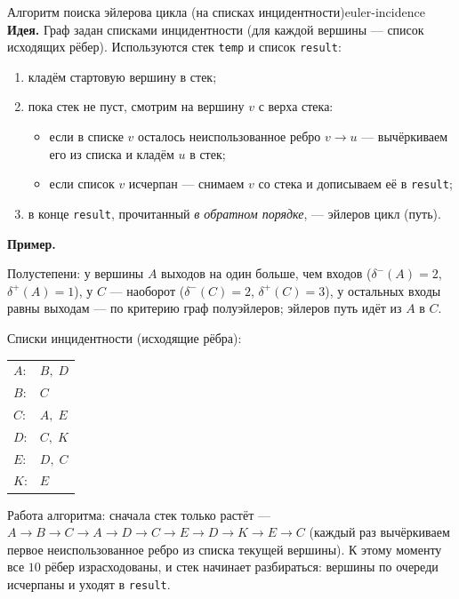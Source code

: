 \begin{algo}{Алгоритм поиска эйлерова цикла (на списках инцидентности)}{euler-incidence}
\textbf{Идея.} Граф задан списками инцидентности (для каждой вершины ---
список исходящих рёбер). Используются стек \texttt{temp} и список
\texttt{result}:

\begin{enumerate}
  \item кладём стартовую вершину в стек;
  \item пока стек не пуст, смотрим на вершину $v$ с верха стека:
  \begin{itemize}
    \item если в списке $v$ осталось неиспользованное ребро $v \to u$ ---
          вычёркиваем его из списка и кладём $u$ в стек;
    \item если список $v$ исчерпан --- снимаем $v$ со стека и дописываем
          её в \texttt{result};
  \end{itemize}
  \item в конце \texttt{result}, прочитанный \emph{в обратном порядке},
        --- эйлеров цикл (путь).
\end{enumerate}

\medskip
\noindent\textbf{Пример.}

Полустепени: у вершины $A$ выходов на один больше, чем входов
($\delta^- (A) = 2$, $\delta^+(A) = 1$), у $C$ --- наоборот
($\delta^-(C) = 2$, $\delta^+(C) = 3$), у остальных входы равны выходам
--- по критерию граф полуэйлеров; эйлеров путь идёт из $A$ в $C$.

\medskip
\noindent Списки инцидентности (исходящие рёбра):

\begin{center}
\begin{tabular}{ll}
$A$: & $B,\; D$ \\
$B$: & $C$ \\
$C$: & $A,\; E$ \\
$D$: & $C,\; K$ \\
$E$: & $D,\; C$ \\
$K$: & $E$ \\
\end{tabular}
\end{center}

\medskip
\noindent Работа алгоритма: сначала стек только растёт ---
$A \to B \to C \to A \to D \to C \to E \to D \to K \to E \to C$ (каждый
раз вычёркиваем первое неиспользованное ребро из списка текущей вершины).
К этому моменту все $10$ рёбер израсходованы, и стек начинает
разбираться: вершины по очереди исчерпаны и уходят в \texttt{result}.


\end{algo}
